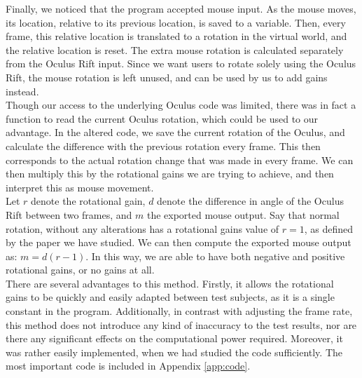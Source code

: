 Finally, we noticed that the program accepted mouse input.
As the mouse moves, its location, relative to its previous location, is saved to a variable.
Then, every frame, this relative location is translated to a rotation in the virtual world, and the relative location is reset.
The extra mouse rotation is calculated separately from the Oculus Rift input.
Since we want users to rotate solely using the Oculus Rift, the mouse rotation is left unused, and can be used by us to add gains instead. \\
Though our access to the underlying Oculus code was limited, there was in fact a function to read the current Oculus rotation, which could be used to our advantage.
In the altered code, we save the current rotation of the Oculus, and calculate the difference with the previous rotation every frame.
This then corresponds to the actual rotation change that was made in every frame.
We can then multiply this by the rotational gains we are trying to achieve, and then interpret this as mouse movement. \\
Let $r$ denote the rotational gain, $d$ denote the difference in angle of the Oculus Rift between two frames, and $m$ the exported mouse output.
Say that normal rotation, without any alterations has a rotational gains value of $r = 1$, as defined by the paper we have studied.
We can then compute the exported mouse output as: $m = d(r - 1)$.
In this way, we are able to have both negative and positive rotational gains, or no gains at all. \\
There are several advantages to this method.
Firstly, it allows the rotational gains to be quickly and easily adapted between test subjects, as it is a single constant in the program.
Additionally, in contrast with adjusting the frame rate, this method does not introduce any kind of inaccuracy to the test results, nor are there any significant effects on the computational power required.
Moreover, it was rather easily implemented, when we had studied the code sufficiently. 
The most important code is included in Appendix \ref{app:code}.\\

